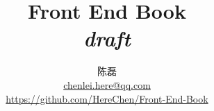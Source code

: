 \documentclass[12pt,a4paper]{article}
\begin{document}
\title{Front End Book \\ \textit{draft}}
\author{陈磊 \\ 
	\url{chenlei.here@qq.com} \\
	\url{https://github.com/HereChen/Front-End-Book}
}
\maketitle



\clearpage %
\tableofcontents



% 
% 
% 
% 


% 


% 
% 
% 

% 
% 
\end{document}
